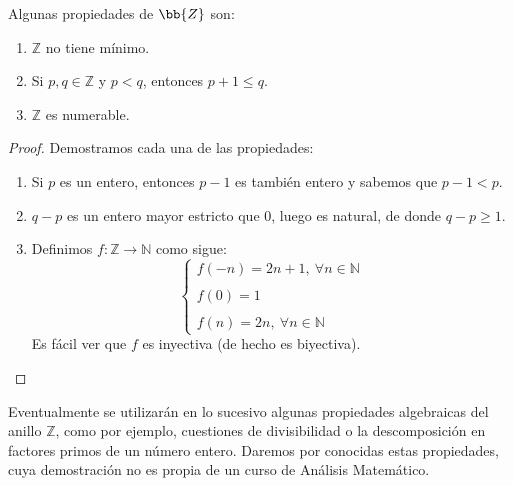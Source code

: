 \begin{prop}Algunas propiedades de $\bb{Z}$ son:
    \begin{enumerate}
        \item $\mathbb{Z}$ no tiene mínimo.

        \item Si $p,q \in \mathbb{Z}$ y $p < q$, entonces $p+1 \leq q$.

        \item $\mathbb{Z}$ es numerable.
    \end{enumerate}
\end{prop}
\begin{proof}
    Demostramos cada una de las propiedades:
    \begin{enumerate}
        \item Si $p$ es un entero, entonces $p-1$ es también entero y sabemos que $p-1 < p$.

        \item $q-p$ es un entero mayor estricto que $0$, luego es natural, de donde $q-p \geq 1$.

        \item Definimos $f:\mathbb{Z} \longrightarrow \mathbb{N}$ como sigue:
        \begin{equation*}
            \left\{ \begin{array}{lcc}
                f(-n)=2n+1,~\forall n \in \mathbb{N} \\ \\
                f(0)=1 \\ \\
                f(n)=2n,~\forall n \in \mathbb{N}
                \end{array}
            \right.
        \end{equation*}
        Es fácil ver que $f$ es inyectiva (de hecho es biyectiva).
    \end{enumerate}
\end{proof}

Eventualmente se utilizarán en lo sucesivo algunas propiedades algebraicas del anillo $\mathbb{Z}$, como por ejemplo, cuestiones de divisibilidad o la descomposición en factores primos de un número entero. Daremos por conocidas estas propiedades, cuya demostración no es propia de un curso de Análisis Matemático.


